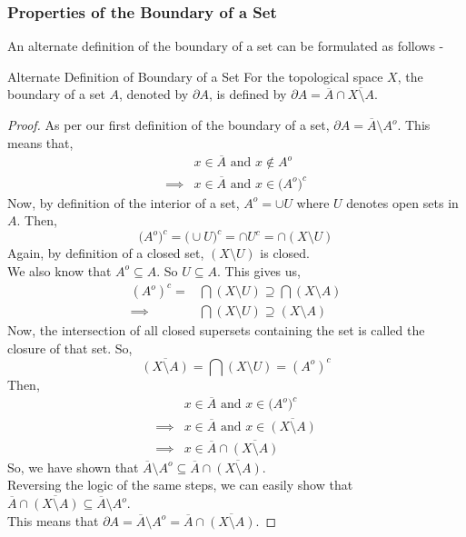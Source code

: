 \subsubsection{Properties of the Boundary of a Set}
An alternate definition of the boundary of a set can be formulated as follows -
\begin{Definition}{Alternate Definition of Boundary of a Set}\label{alternate_definition_boundary}
    For the topological space $X$, the boundary of a set $A$, denoted by $\partial A$, is defined by $\partial A=\overline{A}\cap\overline{X\setminus A}$.
\end{Definition}
\begin{proof}
    As per our first definition of the boundary of a set, $\partial A=\overline{A}\setminus A^o$. This means that,
    \begin{align*}
        & x\in\overline{A}\text{ and }x\notin A^o\\
        \implies& x\in\overline{A}\text{ and }x\in \big(A^o\big)^c
    \end{align*}
    Now, by definition of the interior of a set, $A^o=\cup U$ where $U$ denotes open sets in $A$. Then, $$\big(A^o\big)^c=\big(\cup U\big)^c=\cap U^c=\cap(X\setminus U)$$
    Again, by definition of a closed set, $(X\setminus U)$ is closed.\\
    We also know that $A^o\subseteq A$. So $U\subseteq A$. This gives us,
    \begin{align*}
        (A^o)^c=&\bigcap(X\setminus U)\supseteq\bigcap(X\setminus A)\\
        \implies&\bigcap(X\setminus U)\supseteq(X\setminus A)
    \end{align*}
    Now, the intersection of all closed supersets containing the set is called the closure of that set. So, $$\overline{(X\setminus A)}=\bigcap(X\setminus U)=(A^o)^c$$
    Then,
    \begin{align*}
        & x\in\overline{A}\text{ and }x\in \big(A^o\big)^c\\
        \implies& x\in\overline{A}\text{ and }x\in \overline{(X\setminus A)}\\
        \implies& x\in \overline{A}\cap\overline{(X\setminus A)}
    \end{align*}
    So, we have shown that $\boxed{\overline{A}\setminus A^o\subseteq\overline{A}\cap\overline{(X\setminus A)}}$.\\
    Reversing the logic of the same steps, we can easily show that $\boxed{\overline{A}\cap\overline{(X\setminus A)}\subseteq\overline{A}\setminus A^o}$.\\
    This means that $\partial A=\overline{A}\setminus A^o=\overline{A}\cap\overline{(X\setminus A)}$.
\end{proof}
